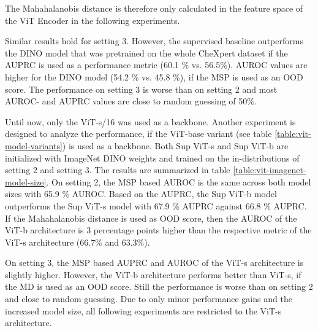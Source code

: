 The Mahahalanobis distance is therefore only calculated in the feature space of the ViT Encoder in the following experiments.
\par
Similar results hold for setting 3. However, the supervised baseline outperforms the DINO model that was pretrained on the whole CheXpert dataset if the AUPRC is used as a performance metric (60.1 \% vs. 56.5\%).
AUROC values are higher for the DINO model (54.2 \% vs. 45.8 \%), if the MSP is used as an OOD score.
The performance on setting 3 is worse than on setting 2 and most AUROC- and AUPRC values are close to random guessing of 50\%.
\par
Until now, only the ViT-s/16 was used as a backbone.
Another experiment is designed to analyze the performance, if the ViT-base variant (see table \ref{table:vit-model-variants}) is used as a backbone.
Both Sup ViT-s and Sup ViT-b are initialized with ImageNet DINO weights and trained on the in-distributions of setting 2 and setting 3.
The results are summarized in table \ref{table:vit-imagenet-model-size}.
On setting 2, the MSP based AUROC is the same across both model sizes with 65.9 \% AUROC.
Based on the AUPRC, the Sup ViT-b model outperforms the Sup ViT-s model with 67.9 \% AUPRC against 66.8 \% AUPRC.
If the Mahahalanobis distance is used as OOD score, then the AUROC of the ViT-b architecture is 3 percentage points higher than the respective metric of the ViT-s architecture (66.7\% and 63.3\%).
\par
On setting 3, the MSP based AUPRC and AUROC of the ViT-s architecture is slightly higher.
However, the ViT-b architecture performs better than ViT-s, if the MD is used as an OOD score.
Still the performance is worse than on setting 2 and close to random guessing.
Due to only minor performance gains and the increased model size, all following experiments are restricted to the ViT-s architecture.
\par
